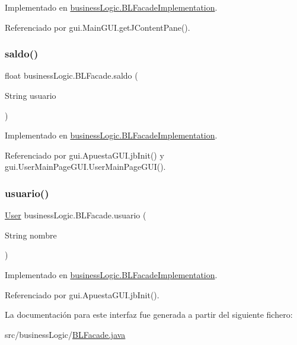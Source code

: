 Implementado en \mbox{\hyperlink{classbusinessLogic_1_1BLFacadeImplementation_afa698129a017866dfc8ae32601fd00fe}{business\+Logic.\+B\+L\+Facade\+Implementation}}.



Referenciado por gui.\+Main\+G\+U\+I.\+get\+J\+Content\+Pane().

\mbox{\label{interfacebusinessLogic_1_1BLFacade_a1b91318bf144ed2eae0c38e385dfdd1f}} 
\subsubsection{\texorpdfstring{saldo()}{saldo()}}
{\footnotesize\ttfamily float business\+Logic.\+B\+L\+Facade.\+saldo (\begin{DoxyParamCaption}\item[{String}]{usuario }\end{DoxyParamCaption})}



Implementado en \mbox{\hyperlink{classbusinessLogic_1_1BLFacadeImplementation_a2ba616628033f05a5f70a0afddb1c970}{business\+Logic.\+B\+L\+Facade\+Implementation}}.



Referenciado por gui.\+Apuesta\+G\+U\+I.\+jb\+Init() y gui.\+User\+Main\+Page\+G\+U\+I.\+User\+Main\+Page\+G\+U\+I().

\mbox{\label{interfacebusinessLogic_1_1BLFacade_aeea4894fe11f25ad2b00531ebcb3fb4c}} 
\subsubsection{\texorpdfstring{usuario()}{usuario()}}
{\footnotesize\ttfamily \mbox{\hyperlink{classdomain_1_1User}{User}} business\+Logic.\+B\+L\+Facade.\+usuario (\begin{DoxyParamCaption}\item[{String}]{nombre }\end{DoxyParamCaption})}



Implementado en \mbox{\hyperlink{classbusinessLogic_1_1BLFacadeImplementation_ab32bba3f140f33d176c85bb4ad8527b4}{business\+Logic.\+B\+L\+Facade\+Implementation}}.



Referenciado por gui.\+Apuesta\+G\+U\+I.\+jb\+Init().



La documentación para este interfaz fue generada a partir del siguiente fichero\+:\begin{DoxyCompactItemize}
\item 
src/business\+Logic/\mbox{\hyperlink{BLFacade_8java}{B\+L\+Facade.\+java}}\end{DoxyCompactItemize}

